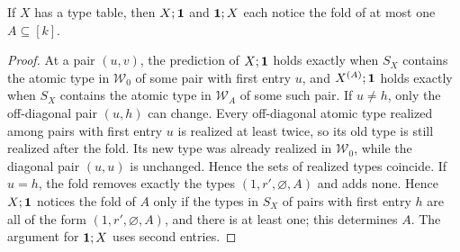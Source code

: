 \begin{lemma}\label{lem:W-projection}
If $X$ has a type table, then $X;\mathbf{1}$ and $\mathbf{1};X$ each notice the fold
of at most one $A\subseteq[k]$.
\end{lemma}
\begin{proof}
At a pair $(u,v)$, the prediction of $X;\mathbf{1}$ holds exactly when $S_X$
contains the atomic type in $\mathcal W_0$ of some pair with first entry
$u$, and $X^{(A)};\mathbf{1}$ holds exactly when $S_X$ contains the atomic type
in $\mathcal W_A$ of some such pair. If $u\ne h$, only the
off-diagonal pair $(u,h)$ can change. Every off-diagonal atomic type
realized among pairs with first entry $u$ is realized at least twice,
so its old type is still realized after the fold. Its new type was
already realized in $\mathcal W_0$, while the diagonal pair $(u,u)$
is unchanged. Hence the sets of realized types coincide. If $u=h$, the fold removes exactly the types
$(1,r',\varnothing,A)$ and adds none. Hence $X;\mathbf{1}$ notices the fold of
$A$ only if the types in $S_X$ of pairs with first entry $h$ are all of
the form $(1,r',\varnothing,A)$, and there is at least one; this
determines $A$. The argument for $\mathbf{1};X$ uses second entries.
\end{proof}

\reverse*
